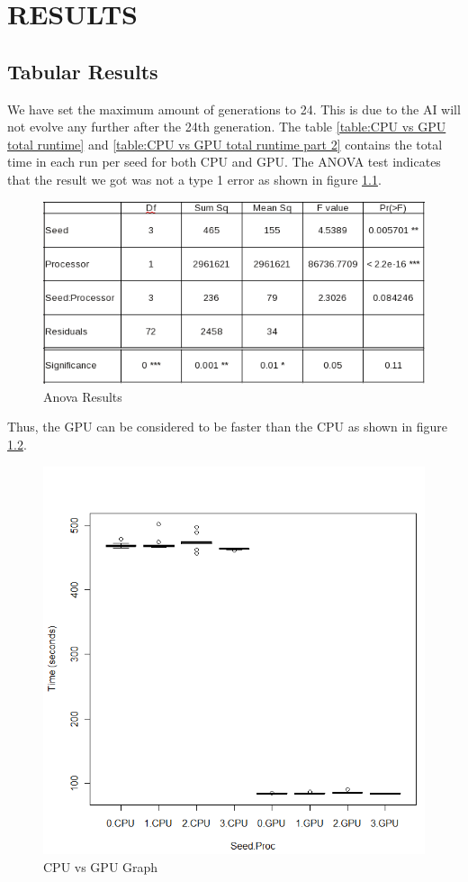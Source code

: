 \chapter{RESULTS}
\section{Tabular Results} 
We have set the maximum amount of generations to 24. This is due to the AI
will not evolve any further after the 24th generation. The 
table \ref{table:CPU vs GPU total runtime} and 
\ref{table:CPU vs GPU total runtime part 2} contains the total time in each
run per seed for both CPU and GPU. The ANOVA test indicates that the result
we got was not a type 1 error as shown in figure \ref{fig:anova_result}.
\begin{figure}
	\centering
		\graphicspath{{images/}}
		\includegraphics[width=260 pt]{Anova_Results.png}
	\caption{Anova Results}
	\label{fig:anova_result}
\end{figure}
Thus, the GPU can be considered to be faster than the CPU as shown in figure
\ref{fig:anova_result_graph}.
\begin{figure}
	\centering
		\graphicspath{{images/}}
		\includegraphics[width=260 pt]{Anova_Result_Graph.png}
	\caption{CPU vs GPU Graph}
	\label{fig:anova_result_graph}
\end{figure}

